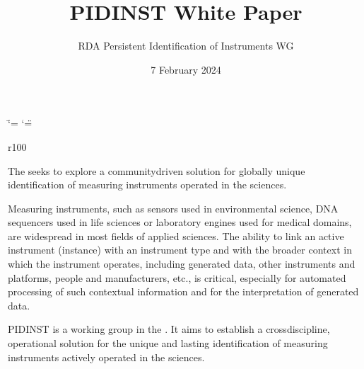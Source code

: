 \documentclass[a4paper,10pt,english]{sphinxmanual}
\title{PIDINST White Paper}
\date{7 February 2024}
\author{RDA Persistent Identification of Instruments WG}
\let\sphinxpxdimen\pdfpxdimen\else\newdimen\sphinxpxdimen
\begin{document}
\ifdefined\shorthandoff
  \ifnum\catcode`\=\string=\active\shorthandoff{=}\fi
  \ifnum\catcode`\"=\active{}\fi
\fi

\pagestyle{empty}
\sphinxmaketitle

\pagestyle{plain}
\label{\detokenize{index::doc}}
\begin{wrapfigure}{r}{100\sphinxpxdimen}
  \sphinxincludegraphics[width=100\sphinxpxdimen]{{pidinst-logo}.pdf}
\end{wrapfigure}
\sphinxAtStartPar
The  seeks to explore a community\sphinxhyphen{}driven solution for globally
unique identification of measuring instruments operated in the
sciences.

\sphinxAtStartPar
Measuring instruments, such as sensors used in environmental science,
DNA sequencers used in life sciences or laboratory engines used for
medical domains, are widespread in most fields of applied sciences.
The ability to link an active instrument (instance) with an instrument
type and with the broader context in which the instrument operates,
including generated data, other instruments and platforms, people and
manufacturers, etc., is critical, especially for automated processing
of such contextual information and for the interpretation of generated
data.

\sphinxAtStartPar
PIDINST is a working group in the .  It aims to establish a cross\sphinxhyphen{}discipline, operational
solution for the unique and lasting identification of measuring
instruments actively operated in the sciences.
\end{document}
